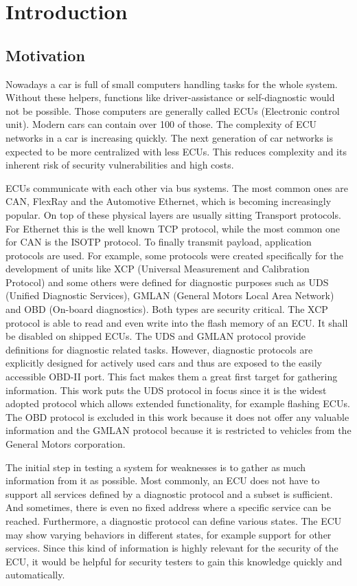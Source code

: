 \section{Introduction}

\subsection{Motivation}
Nowadays a car is full of small computers handling tasks for the whole system. Without these helpers, functions like driver-assistance or self-diagnostic would not be possible. Those computers are generally called ECUs (Electronic control unit). Modern cars can contain over 100 of those. The complexity of ECU networks in a car is increasing quickly. The next generation of car networks is expected to be more centralized with less ECUs. This reduces complexity and its inherent risk of security vulnerabilities and high costs.

ECUs communicate with each other via bus systems. The most common ones are CAN, FlexRay and the Automotive Ethernet, which is becoming increasingly popular. On top of these physical layers are usually sitting Transport protocols. For Ethernet this is the well known TCP protocol, while the most common one for CAN is the ISOTP protocol. To finally transmit payload, application protocols are used. For example, some protocols were created specifically for the development of units like XCP (Universal Measurement and Calibration Protocol) and some others were defined for diagnostic purposes such as UDS (Unified Diagnostic Services), GMLAN (General Motors Local Area Network) and OBD (On-board diagnostics). Both types are security critical. The XCP protocol is able to read and even write into the flash memory of an ECU. It shall be disabled on shipped ECUs. The UDS and GMLAN protocol provide definitions for diagnostic related tasks. However, diagnostic protocols are explicitly designed for actively used cars and thus are exposed to the easily accessible OBD-II port. This fact makes them a great first target for gathering information. This work puts the UDS protocol in focus since it is the widest adopted protocol which allows extended functionality, for example flashing ECUs. The OBD protocol is excluded in this work because it does not offer any valuable information and the GMLAN protocol because it is restricted to vehicles from the General Motors corporation.

The initial step in testing a system for weaknesses is to gather as much information from it as possible. Most commonly, an ECU does not have to support all services defined by a diagnostic protocol and a subset is sufficient. And sometimes, there is even no fixed address where a specific service can be reached.
Furthermore, a diagnostic protocol can define various states. The ECU may show varying behaviors in different states, for example support for other services. Since this kind of information is highly relevant for the security of the ECU, it would be helpful for security testers to gain this knowledge quickly and automatically.

